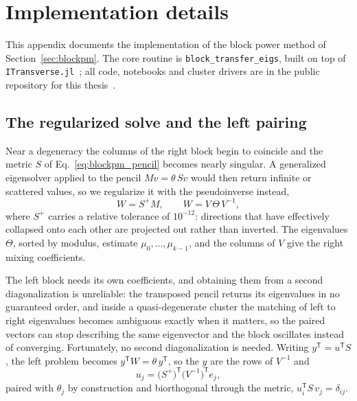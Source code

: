 \FloatBarrier
\section{Implementation details}
\label{app:blockpm}

This appendix documents the implementation of the block power method of Section~\ref{sec:blockpm}. The core routine is \texttt{block\_transfer\_eigs}, built on top of \texttt{ITransverse.jl}~\cite{carignano2025itransverse}; all code, notebooks and cluster drivers are in the public repository for this thesis~\cite{marquezolguin2026code}.

\subsection{The regularized solve and the left pairing}
\label{app:blockpm:pairing}

Near a degeneracy the columns of the right block begin to coincide and the metric $S$ of Eq.~\eqref{eq:blockpm_pencil} becomes nearly singular. A generalized eigensolver applied to the pencil $Mv=\theta\,Sv$ would then return infinite or scattered values, so we regularize it with the pseudoinverse instead,
\begin{equation}
  W = S^{+} M, \qquad W = V\,\Theta\,V^{-1},
  \tag{D1}
\end{equation}
where $S^{+}$ carries a relative tolerance of $10^{-12}$: directions that have effectively collapsed onto each other are projected out rather than inverted. The eigenvalues $\Theta$, sorted by modulus, estimate $\mu_0,\dots,\mu_{k-1}$, and the columns of $V$ give the right mixing coefficients.

The left block needs its own coefficients, and obtaining them from a second diagonalization is unreliable: the transposed pencil returns its eigenvalues in no guaranteed order, and inside a quasi-degenerate cluster the matching of left to right eigenvalues becomes ambiguous exactly when it matters, so the paired vectors can stop describing the same eigenvector and the block oscillates instead of converging. Fortunately, no second diagonalization is needed. Writing $y^{\mathsf T}=u^{\mathsf T}S$, the left problem becomes $y^{\mathsf T}W=\theta\,y^{\mathsf T}$, so the $y$ are the rows of $V^{-1}$ and
\begin{equation}
  u_j = \big(S^{+}\big)^{\mathsf T}\big(V^{-1}\big)^{\mathsf T} e_j ,
  \tag{D2}
\end{equation}
paired with $\theta_j$ by construction and biorthogonal through the metric, $u_i^{\mathsf T}S\,v_j=\delta_{ij}$.

